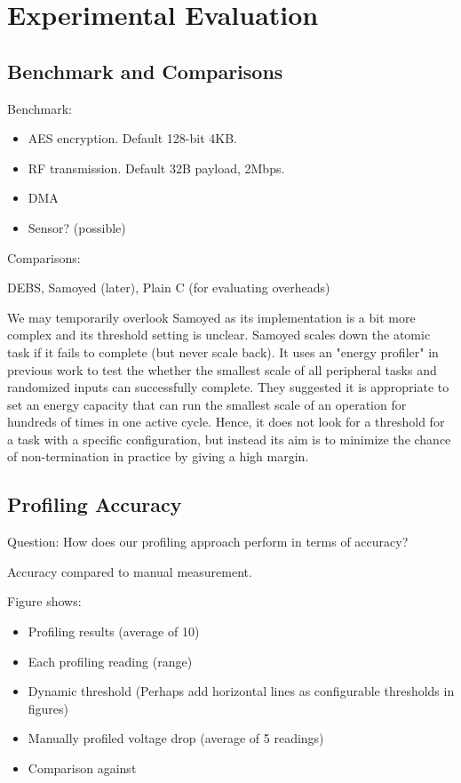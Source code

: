 \newpage
\section{Experimental Evaluation} \label{sec:experiment}

\subsection{Benchmark and Comparisons}

Benchmark: 

\begin{itemize}
    \item AES encryption. Default 128-bit 4KB.
    \item RF transmission. Default 32B payload, 2Mbps.
    \item DMA
    \item Sensor? (possible)
\end{itemize}

Comparisons:

DEBS, Samoyed (later), Plain C (for evaluating overheads)

We may temporarily overlook Samoyed as its implementation is a bit more complex and its threshold setting is unclear. 
Samoyed scales down the atomic task if it fails to complete (but never scale back). 
It uses an "energy profiler" in previous work to test the whether the smallest scale of all peripheral tasks and randomized inputs can successfully complete. 
They suggested it is appropriate to set an energy capacity that can run the smallest scale of an operation for hundreds of times in one active cycle. 
Hence, it does not look for a threshold for a task with a specific configuration, but instead its aim is to minimize the chance of non-termination in practice by giving a high margin.

\subsection{Profiling Accuracy}

Question: How does our profiling approach perform in terms of accuracy?

Accuracy compared to manual measurement.

Figure shows:
\begin{itemize}
    \item Profiling results (average of 10)
    \item Each profiling reading (range)
    \item Dynamic threshold (Perhaps add horizontal lines as configurable thresholds in figures)
    \item Manually profiled voltage drop (average of 5 readings)
    \item Comparison against
\end{itemize}

